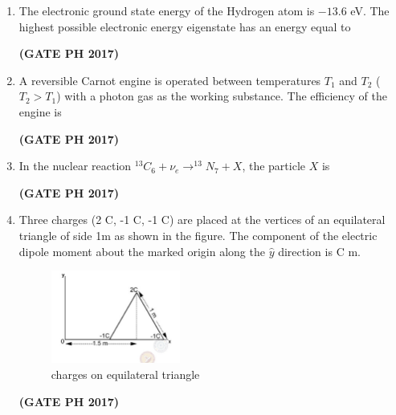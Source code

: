 \documentclass[14pt, a4paper]{extarticle}
\begin{document}
\begin{enumerate}[label=\textbf{Q.\arabic*}]
\item The electronic ground state energy of the Hydrogen atom is $-13.6$ eV. The highest possible electronic energy eigenstate has an energy equal to
\begin{enumerate}
\end{enumerate}
\hfill \textbf{(GATE PH 2017)}

\item A reversible Carnot engine is operated between temperatures $T_1$ and $T_2$ ($T_2>T_1$) with a photon gas as the working substance. The efficiency of the engine is
\begin{enumerate}
\end{enumerate}
\hfill \textbf{(GATE PH 2017)}

\item In the nuclear reaction $^{13}C_6 + \nu_e \to ^{13}N_7 + X$, the particle $X$ is
\begin{enumerate}
\end{enumerate}
\hfill \textbf{(GATE PH 2017)}

\item Three charges (2 C, -1 C, -1 C) are placed at the vertices of an equilateral triangle of side 1m as shown in the figure. The component of the electric dipole moment about the marked origin along the $\hat{y}$ direction is \underline{\hspace{3cm}} C m.
\begin{figure}[H]
\centering
\includegraphics[width=0.4\textwidth]{figs/q26fig17.png}
\caption{charges on equilateral triangle}
\label{fig:q26}
\end{figure}
\hfill \textbf{(GATE PH 2017)}


\end{enumerate}
\end{document}
